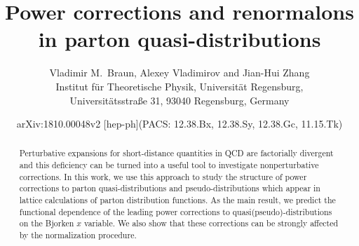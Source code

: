 \documentclass[11pt]{article}
\title{Power corrections and renormalons in parton quasi-distributions}
\author{Vladimir M.\ Braun, Alexey Vladimirov and Jian-Hui Zhang\\[4pt]
\normalsize Institut f\"ur Theoretische Physik, Universit\"at Regensburg,\\
\normalsize Universit\"atsstra\ss{}e 31, 93040 Regensburg, Germany}
\date{arXiv:1810.00048v2 [hep-ph]\quad(PACS: 12.38.Bx, 12.38.Sy, 12.38.Gc, 11.15.Tk)}
\begin{document}
\allowdisplaybreaks
\maketitle

\begin{abstract}%
Perturbative expansions for short-distance quantities in QCD are factorially divergent and
this deficiency can be turned into a useful tool to investigate nonperturbative corrections. In this work, we use this approach
to study the structure of power corrections to parton quasi-distributions and
pseudo-distributions which appear in lattice calculations of parton distribution functions. As the main result,
we predict the functional dependence of the leading power corrections to {quasi(pseudo)}-distributions on the Bjorken $x$ variable. We also show that these corrections
can be strongly affected by the normalization procedure.
\end{abstract}







\end{document}
